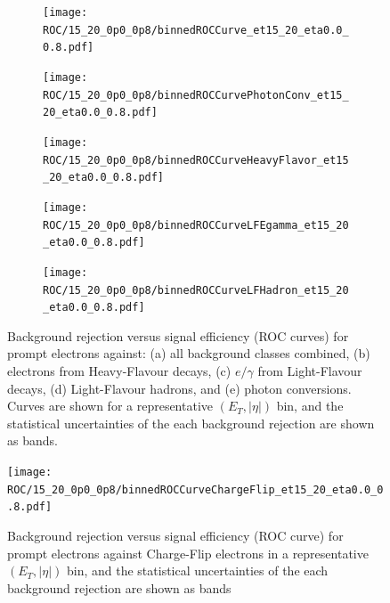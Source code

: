 \begin{figure}[htbp]
  \centering
  
  \begin{subfigure}[t]{0.6\linewidth}
    \centering
    \texttt{[image: ROC/15\_20\_0p0\_0p8/binnedROCCurve\_et15\_20\_eta0.0\_0.8.pdf]}
    \caption{}
    \label{fig:roc_allblkg}
  \end{subfigure}

  \vspace{0.35cm}

  \begin{subfigure}[t]{0.5\linewidth}
    \centering
    \texttt{[image: ROC/15\_20\_0p0\_0p8/binnedROCCurvePhotonConv\_et15\_20\_eta0.0\_0.8.pdf]}
    \caption{}
    \label{fig:roc_pc}
  \end{subfigure}\hfill
  \begin{subfigure}[t]{0.5\linewidth}
    \centering
    \texttt{[image: ROC/15\_20\_0p0\_0p8/binnedROCCurveHeavyFlavor\_et15\_20\_eta0.0\_0.8.pdf]}
    \caption{}
    \label{fig:roc_hf}
  \end{subfigure}

  \vspace{0.35cm}

  \begin{subfigure}[t]{0.5\linewidth}
    \centering
    \texttt{[image: ROC/15\_20\_0p0\_0p8/binnedROCCurveLFEgamma\_et15\_20\_eta0.0\_0.8.pdf]}
    \caption{}
    \label{fig:roc_lfeg}
  \end{subfigure}\hfill
  \begin{subfigure}[t]{0.5\linewidth}
    \centering
    \texttt{[image: ROC/15\_20\_0p0\_0p8/binnedROCCurveLFHadron\_et15\_20\_eta0.0\_0.8.pdf]}
    \caption{}
    \label{fig:roc_lfh}
  \end{subfigure}

  \caption{Background rejection versus signal efficiency (ROC curves) for prompt electrons against:
  (a) all background classes combined,
  (b) electrons from Heavy-Flavour decays,
  (c) $e/\gamma$ from Light-Flavour decays,
  (d) Light-Flavour hadrons,
  and (e) photon conversions.
  Curves are shown for a representative $(E_{T}, |\eta|)$ bin, and the statistical uncertainties of the each background rejection are shown as bands.}
  \label{fig:roc_mainbkg}
\end{figure}


\begin{figure}[htbp]
  \centering
  \texttt{[image: ROC/15\_20\_0p0\_0p8/binnedROCCurveChargeFlip\_et15\_20\_eta0.0\_0.8.pdf]}
  \caption{Background rejection versus signal efficiency (ROC curve) for prompt electrons against Charge-Flip electrons in a representative $(E_{T}, |\eta|)$ bin, and the statistical uncertainties of the each background rejection are shown as bands}
  \label{fig:roc_cf}
\end{figure}

